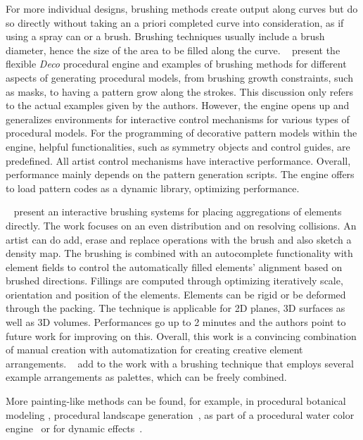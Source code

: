 For more individual designs, brushing methods create output along curves but do so directly without taking an a priori completed curve into consideration, as if using a spray can or a brush. Brushing techniques usually include a brush diameter, hence the size of the area to be filled along the curve. \citeauthor*{mech_2012_tdf}~\cite{mech_2012_tdf} present the flexible \textit{Deco} procedural engine and examples of brushing methods for different aspects of generating procedural models, from brushing growth constraints, such as masks, to having a pattern grow along the strokes. This discussion only refers to the actual examples given by the authors. However, the engine opens up and generalizes environments for interactive control mechanisms for various types of procedural models. For the programming of decorative pattern models within the engine, helpful functionalities, such as symmetry objects and control guides, are predefined. All artist control mechanisms have interactive performance. Overall, performance mainly depends on the pattern generation scripts. The engine offers to load pattern codes as a dynamic library, optimizing performance. 

 \citeauthor*{hsu_2020_aef}~\cite{hsu_2020_aef} present an interactive brushing systems for placing aggregations of elements directly. The work focuses on an even distribution and on resolving collisions. An artist can do add, erase and replace operations with the brush and also sketch a density map. The brushing is combined with an autocomplete functionality with element fields to control the automatically filled elements' alignment based on brushed directions. Fillings are computed through optimizing iteratively scale, orientation and position of the elements. Elements can be rigid or be deformed through the packing. The technique is applicable for 2D planes, 3D surfaces as well as 3D volumes. Performances go up to 2 minutes and the authors point to future work for improving on this. Overall, this work is a convincing combination of manual creation with automatization for creating creative element arrangements. \citeauthor*{davison_2019_ief}~\cite{davison_2019_ief} add to the work with a brushing technique that employs several example arrangements as palettes, which can be freely combined. 

More painting-like methods can be found, for example, in procedural botanical modeling \cite{anastacio_2008_spl,chen_2008_stm,palubicki_2009_sot}, procedural landscape generation~\cite{emilien_2015_wie}, as part of a procedural water color engine~\cite{diverdi_2013_ppp} or for dynamic effects~\cite{xing_2016_eit}. 

